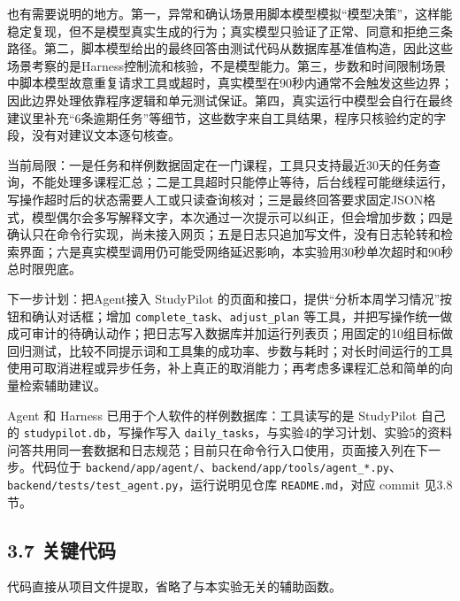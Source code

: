 \documentclass[UTF8,12pt,a4paper]{ctexart}
\begin{document}
也有需要说明的地方。第一，异常和确认场景用脚本模型模拟“模型决策”，这样能稳定复现，但不是模型真实生成的行为；真实模型只验证了正常、同意和拒绝三条路径。第二，脚本模型给出的最终回答由测试代码从数据库基准值构造，因此这些场景考察的是Harness控制流和核验，不是模型能力。第三，步数和时间限制场景中脚本模型故意重复请求工具或超时，真实模型在90秒内通常不会触发这些边界；因此边界处理依靠程序逻辑和单元测试保证。第四，真实运行中模型会自行在最终建议里补充“6条逾期任务”等细节，这些数字来自工具结果，程序只核验约定的字段，没有对建议文本逐句核查。

当前局限：一是任务和样例数据固定在一门课程，工具只支持最近30天的任务查询，不能处理多课程汇总；二是工具超时只能停止等待，后台线程可能继续运行，写操作超时后的状态需要人工或只读查询核对；三是最终回答要求固定JSON格式，模型偶尔会多写解释文字，本次通过一次提示可以纠正，但会增加步数；四是确认只在命令行实现，尚未接入网页；五是日志只追加写文件，没有日志轮转和检索界面；六是真实模型调用仍可能受网络延迟影响，本实验用30秒单次超时和90秒总时限兜底。

下一步计划：把Agent接入 StudyPilot 的页面和接口，提供“分析本周学习情况”按钮和确认对话框；增加 \texttt{complete\_task}、\texttt{adjust\_plan} 等工具，并把写操作统一做成可审计的待确认动作；把日志写入数据库并加运行列表页；用固定的10组目标做回归测试，比较不同提示词和工具集的成功率、步数与耗时；对长时间运行的工具使用可取消进程或异步任务，补上真正的取消能力；再考虑多课程汇总和简单的向量检索辅助建议。

Agent 和 Harness 已用于个人软件的样例数据库：工具读写的是 StudyPilot 自己的 \texttt{studypilot.db}，写操作写入 \texttt{daily\_tasks}，与实验4的学习计划、实验5的资料问答共用同一套数据和日志规范；目前只在命令行入口使用，页面接入列在下一步。代码位于 \texttt{backend/app/agent/}、\texttt{backend/app/tools/agent\_*.py}、\texttt{backend/tests/test\_agent.py}，运行说明见仓库 \texttt{README.md}，对应 commit 见3.8节。

\subsection*{3.7 关键代码}

代码直接从项目文件提取，省略了与本实验无关的辅助函数。




\end{document}
